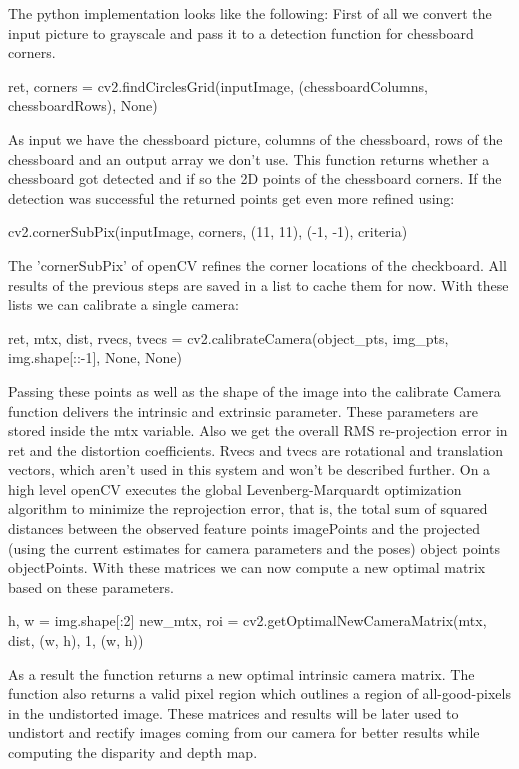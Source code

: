 \documentclass[journal,onecolumn]{IEEEtran}
\begin{document}
The python implementation looks like the following: \newline
First of all we convert the input picture to grayscale and pass it to a detection function for chessboard corners.
\begin{python}
ret, corners = cv2.findCirclesGrid(inputImage, (chessboardColumns, chessboardRows), None)
\end{python}
As input we have the chessboard picture, columns of the chessboard, rows of the chessboard and an output array we don't use.
This function returns whether a chessboard got detected and if so the 2D points of the chessboard corners. If the detection was successful the returned points get even more refined using:
\begin{python}
cv2.cornerSubPix(inputImage, corners, (11, 11), (-1, -1), criteria)
\end{python}
The 'cornerSubPix' of openCV refines the corner locations \cite{forstner} of the checkboard.
All results of  the previous steps are saved in a list to cache them for now. With these lists we can calibrate a single camera:
\begin{python}
ret, mtx, dist, rvecs, tvecs = cv2.calibrateCamera(object_pts, img_pts, img.shape[::-1], None, None)
\end{python}
Passing these points as well as the shape of the image into the calibrate Camera function delivers the intrinsic and extrinsic parameter.
These parameters are stored inside the mtx variable. Also we get the overall RMS re-projection error in ret and the distortion coefficients. Rvecs\cite{DBLP} and tvecs are rotational and translation vectors, which aren't used in this system and won't be described further.
On a high level openCV executes the global Levenberg-Marquardt optimization algorithm to minimize the reprojection error, that is, the total sum of squared distances between the observed feature points imagePoints and the projected (using the current estimates for camera parameters and the poses) object points objectPoints\cite{calibrateCamera}.
With these matrices we can now compute a new optimal matrix based on these parameters.
\begin{python}
h, w = img.shape[:2]
new_mtx, roi = cv2.getOptimalNewCameraMatrix(mtx,
				   	     dist,
				   	     (w, h), 1, (w, h))
\end{python}
As a result the function returns a new optimal intrinsic camera matrix. The function also returns a valid pixel region which outlines a region of all-good-pixels in the undistorted image. These matrices and results will be later used to undistort and rectify images coming from our camera for better results while computing the disparity and depth map.
\end{document}
